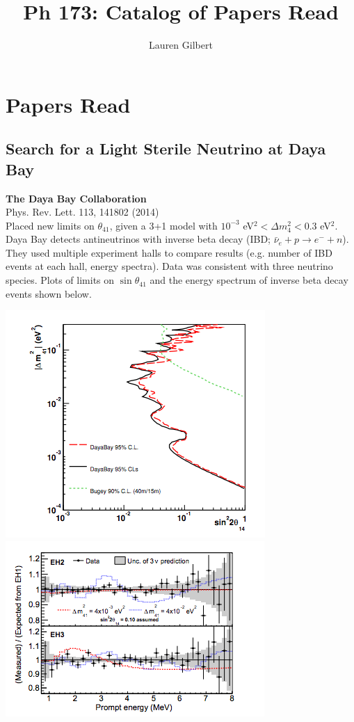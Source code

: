 \documentclass[english]{article}
\title{Ph 173: Catalog of Papers Read}
\author{Lauren Gilbert}
\begin{document}
\maketitle
\section{Papers Read}
\subsection{Search for a Light Sterile Neutrino at Daya Bay}
\noindent \textbf{The Daya Bay Collaboration} \\
\noindent Phys. Rev. Lett. 113, 141802 (2014) \\

\noindent Placed new limits on $\theta_{41}$, given a 3+1 model with $10^{-3}$ eV$^2 < \Delta m_4^2 < 0.3$ eV$^2$.  Daya Bay detects antineutrinos with inverse beta decay (IBD; $\bar{\nu}_e + p \rightarrow e^- + n$).  They used multiple experiment halls to compare results (e.g. number of IBD events at each hall, energy spectra).  Data was consistent with three neutrino species.  Plots of limits on $\sin\theta_{41}$ and the energy spectrum of inverse beta decay events shown below.

\includegraphics[scale=0.6]{dayabay1.png}
\includegraphics[scale=0.6]{dayabay2.png}
\end{document}
